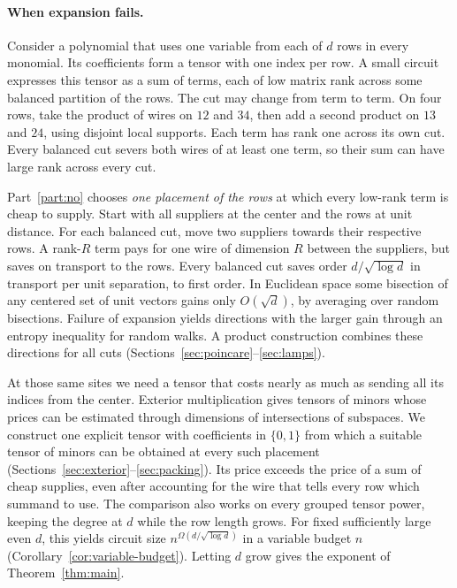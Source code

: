 

\paragraph{When expansion fails.}
Consider a polynomial that uses one variable from each of $d$ rows in
every monomial. Its coefficients form a tensor with one index per row.
A small circuit expresses this tensor as a sum of terms, each of low
matrix rank across some balanced partition of the rows. The cut may
change from term to term. On four rows, take the product of wires on
$12$ and $34$, then add a second product on $13$ and $24$, using
disjoint local supports. Each term has rank one across its own cut.
Every balanced cut severs both wires of at least one term, so their
sum can have large rank across every cut.

Part~\ref{part:no} chooses \emph{one placement of the rows} at which
every low-rank term is cheap to supply. Start with all suppliers at the
center and the rows at unit distance. For each balanced cut, move two
suppliers towards their respective rows. A rank-$R$ term pays for one
wire of dimension $R$ between the suppliers, but saves on transport to
the rows. Every balanced cut saves order
$d/\sqrt{\log d}$ in transport per unit separation, to first order.
In Euclidean space some bisection of any centered set of unit vectors
gains only $O(\sqrt d)$, by averaging over random bisections. Failure of
expansion yields directions with the larger gain through an entropy
inequality for random walks. A product construction combines these
directions for all cuts (Sections~\ref{sec:poincare}--\ref{sec:lamps}).

At those same sites we need a tensor that costs nearly as much as
sending all its indices from the center. Exterior multiplication gives
tensors of minors whose prices can be estimated through dimensions of
intersections of subspaces. We construct one explicit tensor
with coefficients in $\{0,1\}$ from which a suitable tensor of minors
can be obtained at every such placement
(Sections~\ref{sec:exterior}--\ref{sec:packing}). Its price exceeds
the price of a sum of cheap supplies, even after accounting for the wire
that tells every row which summand to use. The comparison also works on
every grouped tensor power, keeping the degree at $d$ while the row
length grows. For fixed sufficiently large even $d$, this yields circuit size
$n^{\Omega(d/\sqrt{\log d})}$ in a variable budget $n$
(Corollary~\ref{cor:variable-budget}).
Letting $d$ grow gives the exponent of Theorem~\ref{thm:main}.

